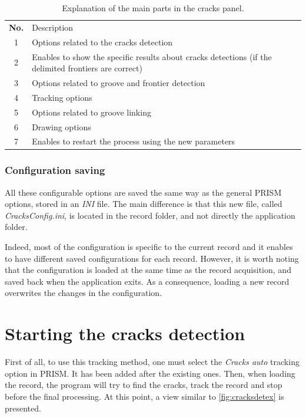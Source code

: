 \begin{table}[h!]
\begin{center}
\tabulinesep=3pt
\begin{tabu} to 0.8\textwidth {| c | X[m] |} %
    \everyrow{\hline}
    \hline
    \rowfont[c] \bfseries
        No. & Description \\
        1 & Options related to the cracks detection \\
        2 & Enables to show the specific results about cracks detections (if the delimited frontiers are correct) \\
        3 & Options related to groove and frontier detection \\
        4 & Tracking options \\
        5 & Options related to groove linking \\
        6 & Drawing options \\
        7 & Enables to restart the process using the new parameters \\
\end{tabu}
\end{center}
\caption{Explanation of the main parts in the cracks panel.}
\label{tab:autoguicontrols}
\end{table}

\subsubsection{Configuration saving}

All these configurable options are saved the same way as the general PRISM options, stored in an \emph{INI} file. The main difference is that this new file, called \emph{CracksConfig.ini}, is located in the record folder, and not directly the application folder.

Indeed, most of the configuration is specific to the current record and it enables to have different saved configurations for each record. However, it is worth noting that the configuration is loaded at the same time as the record acquisition, and saved back when the application exits. As a consequence, loading a new record overwrites the changes in the configuration.

\section{Starting the cracks detection}
\label{sec:setcrackdet}

First of all, to use this tracking method, one must select the \emph{Cracks auto} tracking option in PRISM. It has been added after the existing ones. Then, when loading the record, the program will try to find the cracks, track the record and stop before the final processing. At this point, a view similar to \autoref{fig:cracksdetex} is presented.

